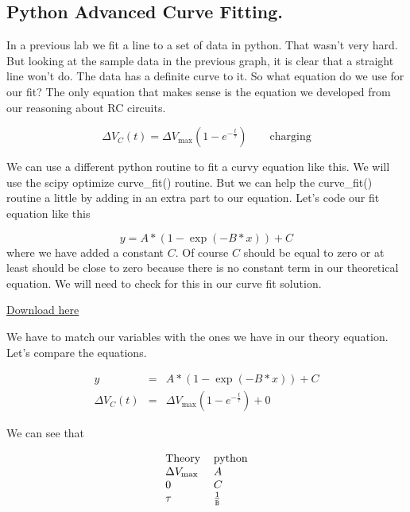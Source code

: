 \subsection{Python Advanced Curve Fitting.}

In a previous lab we fit a line to a set of data in python. That wasn't very hard. But looking at the sample data in the previous graph, it is clear that a straight line won't do.  The data has a definite curve to it. So what equation do we use for our fit? The only equation that makes sense is the equation we developed from our reasoning about RC circuits.

\begin{equation*}
	\Delta V_{C}\left( t\right) =\Delta V_{\max }\left( 1-e^{-\frac{t}{\tau }}\right) \qquad \text{charging}
\end{equation*}

We can use a different python routine to fit a curvy equation like this.  We will use the scipy optimize curve\_fit() routine. But we can help the curve\_fit() routine a little by adding in an extra part to our equation. Let's code our fit equation like this

\begin{equation*}
	y=A\ast (1-\exp (-B\ast x))+C
\end{equation*}
where we have added a constant $C$. Of course $C$ should be equal to zero or at least should be close to zero because there is no constant term in our theoretical equation. We will need to check for this in our curve fit solution. 

\href{https://raw.githubusercontent.com/rtlines/IntermediateLabPH250/main/Code/user_function_curve_fit_2.py}{Download here}



We have to match our variables with the ones we have in our theory equation. Let's compare the equations. 

\begin{eqnarray*}
	y &=&A\ast (1-\exp (-B\ast x))+C \\
	\Delta V_{C}\left( t\right) &=&\Delta V_{\max }\left( 1-e^{-\frac{t}{\tau }}\right) +0
\end{eqnarray*}

We can see that 

\begin{equation*}
	\begin{tabular}{ll}
	                Theory & python \\ 
		$\Delta V_{\max }$ & $A$ \\ 
	                   $0$ & $C$ \\ 
	               $\tau $ & $\frac{1}{\mathtt{B}}$%
	\end{tabular}
\end{equation*}


